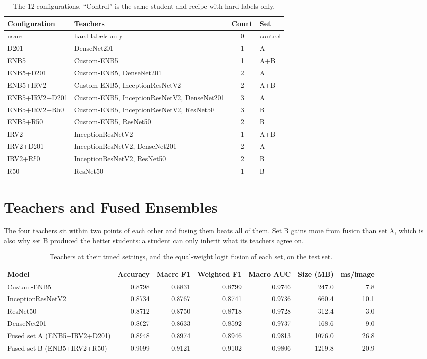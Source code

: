 \documentclass[10pt,letterpaper]{article}
\begin{document}
\begin{table}[H]
\centering
\small
\caption{The 12 configurations. ``Control'' is the same student and recipe with hard labels only.}
\begin{tabular}{@{}llcl@{}}
\toprule
Configuration & Teachers & Count & Set \\
\midrule
none & hard labels only & 0 & control \\
D201 & DenseNet201 & 1 & A \\
ENB5 & Custom-ENB5 & 1 & A+B \\
ENB5+D201 & Custom-ENB5, DenseNet201 & 2 & A \\
ENB5+IRV2 & Custom-ENB5, InceptionResNetV2 & 2 & A+B \\
ENB5+IRV2+D201 & Custom-ENB5, InceptionResNetV2, DenseNet201 & 3 & A \\
ENB5+IRV2+R50 & Custom-ENB5, InceptionResNetV2, ResNet50 & 3 & B \\
ENB5+R50 & Custom-ENB5, ResNet50 & 2 & B \\
IRV2 & InceptionResNetV2 & 1 & A+B \\
IRV2+D201 & InceptionResNetV2, DenseNet201 & 2 & A \\
IRV2+R50 & InceptionResNetV2, ResNet50 & 2 & B \\
R50 & ResNet50 & 1 & B \\
\bottomrule
\end{tabular}
\end{table}

\section{Teachers and Fused Ensembles}
The four teachers sit within two points of each other and fusing them beats all of them. Set B gains more
from fusion than set A, which is also why set B produced the better students: a student can only inherit
what its teachers agree on.

\begin{table}[H]
\centering
\small
\caption{Teachers at their tuned settings, and the equal-weight logit fusion of each set, on the test set.}
\begin{tabular}{@{}lrrrrrr@{}}
\toprule
Model & Accuracy & Macro F1 & Weighted F1 & Macro AUC & Size (MB) & ms/image \\
\midrule
Custom-ENB5 & 0.8798 & 0.8831 & 0.8799 & 0.9746 & 247.0 & 7.8 \\
InceptionResNetV2 & 0.8734 & 0.8767 & 0.8741 & 0.9736 & 660.4 & 10.1 \\
ResNet50 & 0.8712 & 0.8750 & 0.8718 & 0.9728 & 312.4 & 3.0 \\
DenseNet201 & 0.8627 & 0.8633 & 0.8592 & 0.9737 & 168.6 & 9.0 \\
\midrule
Fused set A (ENB5+IRV2+D201) & 0.8948 & 0.8974 & 0.8946 & 0.9813 & 1076.0 & 26.8 \\
Fused set B (ENB5+IRV2+R50) & 0.9099 & 0.9121 & 0.9102 & 0.9806 & 1219.8 & 20.9 \\
\bottomrule
\end{tabular}
\end{table}
\end{document}
